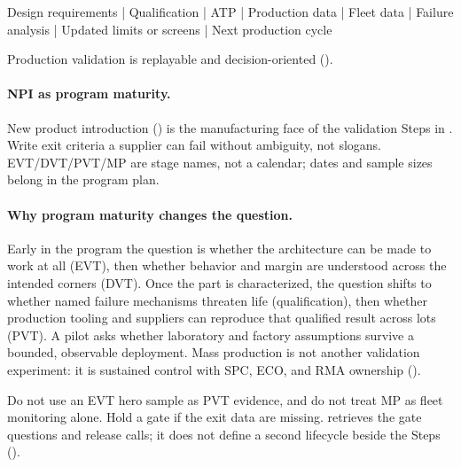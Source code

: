 \begin{dectree}
Design requirements
  |
Qualification
  |
ATP
  |
Production data
  |
Fleet data
  |
Failure analysis
  |
Updated limits or screens
  |
Next production cycle
\end{dectree}

Production validation is replayable and decision-oriented
().

\paragraph{NPI as program maturity.}
New product introduction () is the manufacturing face of
the validation Steps in . Write exit criteria a
supplier can fail without ambiguity, not slogans. EVT/DVT/PVT/MP are stage
names, not a calendar; dates and sample sizes belong in the program plan.

\paragraph{Why program maturity changes the question.}
Early in the program the question is whether the architecture can be made to
work at all (EVT), then whether behavior and margin are understood across the
intended corners (DVT). Once the part is characterized, the question shifts to
whether named failure mechanisms threaten life (qualification), then whether
production tooling and suppliers can reproduce that qualified result across lots
(PVT). A pilot asks whether laboratory and factory assumptions survive a
bounded, observable deployment. Mass production is not another validation
experiment: it is sustained control with SPC, ECO, and RMA ownership
().

Do not use an EVT hero sample as PVT evidence, and do not treat MP as fleet
monitoring alone. Hold a gate if the exit data are missing.
 retrieves the gate questions and release calls; it does not
define a second lifecycle beside the Steps
().

